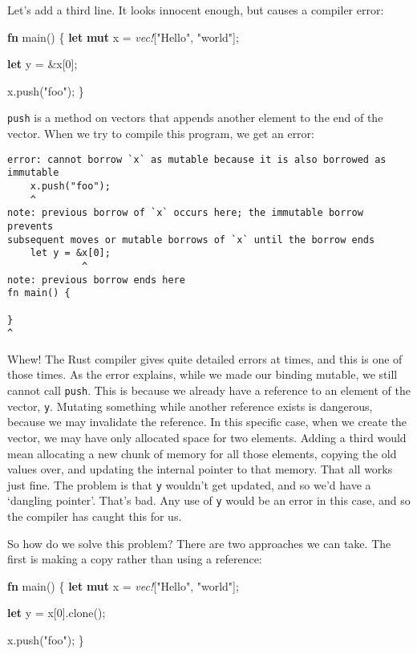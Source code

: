 \documentclass[a4paper,]{book}
\newenvironment{Shaded}{\begin{snugshade}}{\end{snugshade}}
\newcommand{\KeywordTok}[1]{\textcolor[rgb]{0.13,0.29,0.53}{\textbf{{#1}}}}
\newcommand{\DecValTok}[1]{\textcolor[rgb]{0.00,0.00,0.81}{{#1}}}
\newcommand{\StringTok}[1]{\textcolor[rgb]{0.31,0.60,0.02}{{#1}}}
\newcommand{\PreprocessorTok}[1]{\textcolor[rgb]{0.56,0.35,0.01}{\textit{{#1}}}}
\newcommand{\NormalTok}[1]{{#1}}
\begin{document}
Let's add a third line. It looks innocent enough, but causes a compiler
error:

\begin{Shaded}
\begin{Highlighting}[]
\KeywordTok{fn} \NormalTok{main() \{}
    \KeywordTok{let} \KeywordTok{mut} \NormalTok{x = }\PreprocessorTok{vec!}\NormalTok{[}\StringTok{"Hello"}\NormalTok{, }\StringTok{"world"}\NormalTok{];}

    \KeywordTok{let} \NormalTok{y = &x[}\DecValTok{0}\NormalTok{];}

    \NormalTok{x.push(}\StringTok{"foo"}\NormalTok{);}
\NormalTok{\}}
\end{Highlighting}
\end{Shaded}

\texttt{push} is a method on vectors that appends another element to the
end of the vector. When we try to compile this program, we get an error:

\begin{verbatim}
error: cannot borrow `x` as mutable because it is also borrowed as immutable
    x.push("foo");
    ^
note: previous borrow of `x` occurs here; the immutable borrow prevents
subsequent moves or mutable borrows of `x` until the borrow ends
    let y = &x[0];
             ^
note: previous borrow ends here
fn main() {

}
^
\end{verbatim}

Whew! The Rust compiler gives quite detailed errors at times, and this
is one of those times. As the error explains, while we made our binding
mutable, we still cannot call \texttt{push}. This is because we already
have a reference to an element of the vector, \texttt{y}. Mutating
something while another reference exists is dangerous, because we may
invalidate the reference. In this specific case, when we create the
vector, we may have only allocated space for two elements. Adding a
third would mean allocating a new chunk of memory for all those
elements, copying the old values over, and updating the internal pointer
to that memory. That all works just fine. The problem is that \texttt{y}
wouldn't get updated, and so we'd have a `dangling pointer'. That's bad.
Any use of \texttt{y} would be an error in this case, and so the
compiler has caught this for us.

So how do we solve this problem? There are two approaches we can take.
The first is making a copy rather than using a reference:

\begin{Shaded}
\begin{Highlighting}[]
\KeywordTok{fn} \NormalTok{main() \{}
    \KeywordTok{let} \KeywordTok{mut} \NormalTok{x = }\PreprocessorTok{vec!}\NormalTok{[}\StringTok{"Hello"}\NormalTok{, }\StringTok{"world"}\NormalTok{];}

    \KeywordTok{let} \NormalTok{y = x[}\DecValTok{0}\NormalTok{].clone();}

    \NormalTok{x.push(}\StringTok{"foo"}\NormalTok{);}
\NormalTok{\}}
\end{Highlighting}
\end{Shaded}
\end{document}
